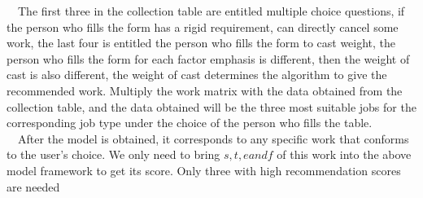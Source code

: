 \documentclass[12pt]{article}
\begin{document}
~~The first three in the collection table are entitled multiple choice questions, if the person who fills the form has a rigid requirement, can directly cancel some work, the last four is entitled the person who fills the form to cast weight, the person who fills the form for each factor emphasis is different, then the weight of cast is also different, the weight of cast determines the algorithm to give the recommended work. Multiply the work matrix with the data obtained from the collection table, and the data obtained will be the three most suitable jobs for the corresponding job type under the choice of the person who fills the table.\\%
~~After the model is obtained, it corresponds to any specific work that conforms to the user's choice. We only need to bring $s, t, e and f$ of this work into the above model framework to get its score. Only three with high recommendation scores are needed\\%
\end{document}
